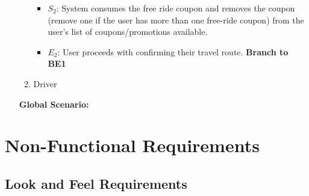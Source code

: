 \documentclass[]{article}
\begin{document}
\begin{enumerate}[{\bf BE1.}]
\begin{enumerate}[{\bf VP1.}]
{{\begin{itemize}
\begin{itemize}
						\item[]$E_{1.2}$: User responds with “Yes” and would like to redeem a free ride.
					\end{itemize}
					\item {$S_{2}$:} System consumes the free ride coupon and removes the coupon (remove one if the user has more than one free-ride coupon) from the user's list of coupons/promotions available.
					\item {$E_{2}$:} User proceeds with confirming their travel route. \textbf{\color{red}\textlangle Branch to BE1 \textrangle}
				\end{itemize}
			}
		}
		\item Driver \\
		\noindent{}
	\end{enumerate}
	{\bf Global Scenario:}\\
	\noindent{}
\end{enumerate}


\section{Non-Functional Requirements}
\label{sec:non-functional_requirements}

\subsection{Look and Feel Requirements}
\label{sub:look_and_feel_requirements}
\end{document}
